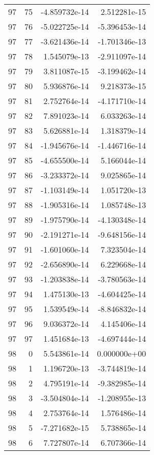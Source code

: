 \begin{tabular}{rrrr}
  97 &   75 & -4.859732e-14 &  2.512281e-15 \\
  97 &   76 & -5.022725e-14 & -5.396453e-14 \\
  97 &   77 & -3.621436e-14 & -1.701346e-13 \\
  97 &   78 &  1.545079e-13 & -2.911097e-14 \\
  97 &   79 &  3.811087e-15 & -3.199462e-14 \\
  97 &   80 &  5.936876e-14 &  9.218373e-15 \\
  97 &   81 &  2.752764e-14 & -4.171710e-14 \\
  97 &   82 &  7.891023e-14 &  6.033263e-14 \\
  97 &   83 &  5.626881e-14 &  1.318379e-14 \\
  97 &   84 & -1.945676e-14 & -1.446716e-14 \\
  97 &   85 & -4.655500e-14 &  5.166044e-14 \\
  97 &   86 & -3.233372e-14 &  9.025865e-14 \\
  97 &   87 & -1.103149e-14 &  1.051720e-13 \\
  97 &   88 & -1.905316e-14 &  1.085748e-13 \\
  97 &   89 & -1.975790e-14 & -4.130348e-14 \\
  97 &   90 & -2.191271e-14 & -9.648156e-14 \\
  97 &   91 & -1.601060e-14 &  7.323504e-14 \\
  97 &   92 & -2.656890e-14 &  6.229668e-14 \\
  97 &   93 & -1.203838e-14 & -3.780563e-14 \\
  97 &   94 &  1.475130e-13 & -4.604425e-14 \\
  97 &   95 &  1.539549e-14 & -8.846832e-14 \\
  97 &   96 &  9.036372e-14 &  4.145406e-14 \\
  97 &   97 &  1.451684e-13 & -4.697444e-14 \\
  98 &    0 &  5.543861e-14 &  0.000000e+00 \\
  98 &    1 &  1.196720e-13 & -3.744819e-14 \\
  98 &    2 &  4.795191e-14 & -9.382985e-14 \\
  98 &    3 & -3.504804e-14 & -1.208955e-13 \\
  98 &    4 &  2.753764e-14 &  1.576486e-14 \\
  98 &    5 & -7.271682e-15 &  5.738865e-14 \\
  98 &    6 &  7.727807e-14 &  6.707366e-14 \\

\end{tabular}
